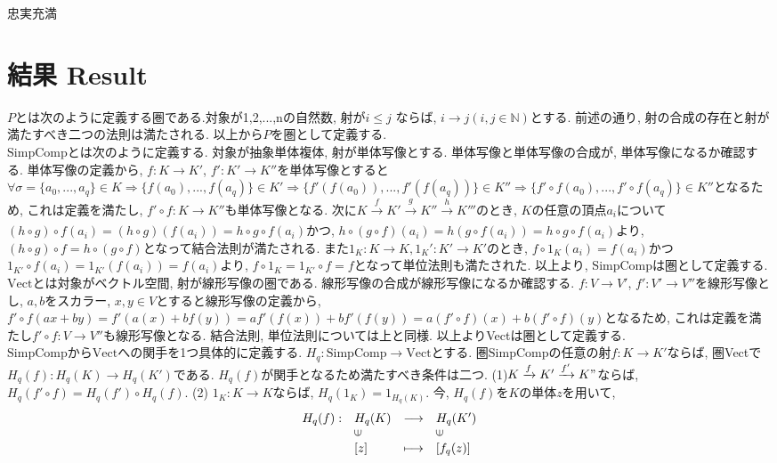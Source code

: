 \documentclass[a4paper]{jsarticle}
\theoremstyle{definition}
\newcommand{\SimpComp}{{\mathrm{SimpComp}}}
\newcommand{\Vect}{{\mathrm{Vect}}}
\begin{document}
忠実充満\\



\section{結果 Result}
$P$とは次のように定義する圏である.対象が1,2,...,nの自然数, 射が$i \leq j$ ならば,  $i\rightarrow j(i, j \in \mathbb{N})$とする. 前述の通り, 射の合成の存在と射が満たすべき二つの法則は満たされる. 以上から$P$を圏として定義する. \\
$\SimpComp$とは次のように定義する. 対象が抽象単体複体, 射が単体写像とする. 
単体写像と単体写像の合成が, 単体写像になるか確認する. 単体写像の定義から, $f:K\rightarrow K'$, $f':K'\rightarrow K''$を単体写像とすると$\forall\sigma =\{a_0,...,a_q\}\in K\Rightarrow \{f(a_0),...,f(a_q)\}\in K'\Rightarrow\{f'(f(a_0)),...,f'(f(a_q))\}\in K''\Rightarrow\{f'\circ f(a_0),...,f'\circ f(a_q)\}\in K''$となるため, これは定義を満たし, $f'\circ f:K\rightarrow K''$も単体写像となる. 次に$K\xrightarrow[]{f} K'\xrightarrow[]{g} K''\xrightarrow[]{h}K'''$のとき, $K$の任意の頂点$a_i$について$(h\circ g)\circ f(a_i)=(h\circ g)(f(a_i))=h\circ g\circ f(a_i)$かつ, $h\circ (g\circ f)(a_i)=h(g\circ f(a_i))=h\circ g\circ f(a_i)$より, $(h\circ g)\circ f=h\circ (g\circ f)$となって結合法則が満たされる. また$1_K:K\rightarrow K, 1_K':K'\rightarrow K'$のとき, $f\circ 1_K(a_i)=f(a_i)$かつ$1_{K'}\circ f(a_i)=1_{K'}(f(a_i))=f(a_i)$より, $f\circ 1_K=1_{K'}\circ f=f$となって単位法則も満たされた. 以上より, SimpCompは圏として定義する.\\
$\Vect$とは対象がベクトル空間, 射が線形写像の圏である. 線形写像の合成が線形写像になるか確認する. $f:V\rightarrow V'$, $f':V'\rightarrow V''$を線形写像とし, $a, b$をスカラー, $x, y\in V$とすると線形写像の定義から, $f'\circ f(ax+by)=f'(a(x)+bf(y))=af'(f(x))+bf'(f(y))=a(f'\circ f)(x)+b(f'\circ f)(y)$となるため, これは定義を満たし$f'\circ f:V\rightarrow V''$も線形写像となる. 結合法則, 単位法則については上と同様. 以上よりVectは圏として定義する. \\
$\SimpComp$から$\Vect$への関手を1つ具体的に定義する. $H_q:\SimpComp \rightarrow \Vect$とする. 圏$\SimpComp$の任意の射$f:K\rightarrow K'$ならば, 圏Vectで$H_q(f):H_q(K)\rightarrow H_q(K')$である. $H_q(f)$が関手となるため満たすべき条件は二つ. (1)$K\xrightarrow[]{f}K'\xrightarrow[]{f'}K"$ならば, $H_q(f'\circ f) = H_q(f')\circ H_q(f)$. (2) $1_K:K\rightarrow K$ならば, $H_q(1_K)=1_{H_q(K)}$. 今, $H_q(f)$を$K$の単体$z$を用いて, 
\begin{equation}
    \begin{array}{llll}
         H_q(f):& H_q(K) & \longrightarrow & H_q(K') \\
        & \rotatebox{90}{$\in$} & & \rotatebox{90}{$\in$} \\
        & [z] & \longmapsto & [f_q(z)]\\
    \end{array}
\end{equation}
\end{document}
